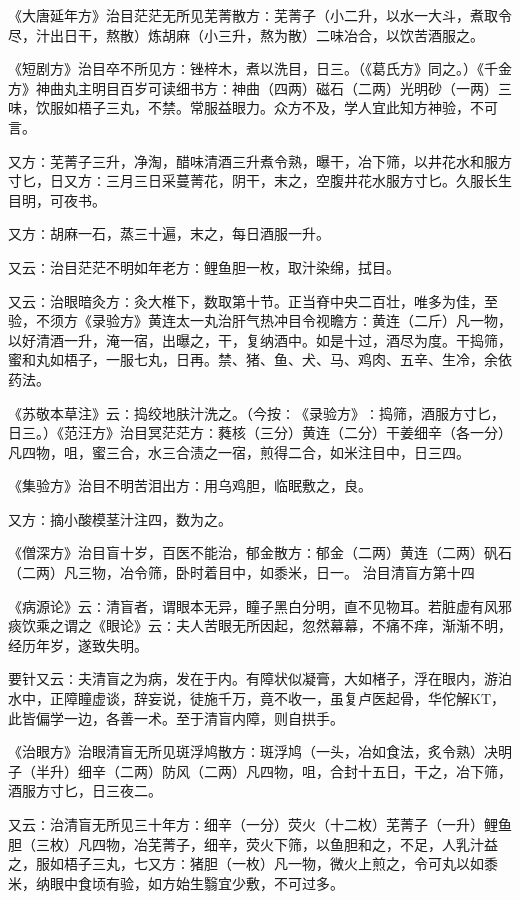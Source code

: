 \documentclass[a4paper,12pt,UTF8,twoside]{ctexbook}
\begin{document}
《大唐延年方》治目茫茫无所见芜菁散方∶芜菁子（小二升，以水一大斗，煮取令尽，汁出日干，熬散）炼胡麻（小三升，熬为散）二味冶合，以饮苦酒服之。

《短剧方》治目卒不所见方∶锉梓木，煮以洗目，日三。（《葛氏方》同之。）《千金方》神曲丸主明目百岁可读细书方∶神曲（四两）磁石（二两）光明砂（一两）三味，饮服如梧子三丸，不禁。常服益眼力。众方不及，学人宜此知方神验，不可言。

又方∶芜菁子三升，净淘，醋味清酒三升煮令熟，曝干，冶下筛，以井花水和服方寸匕，日又方∶三月三日采蔓菁花，阴干，末之，空腹井花水服方寸匕。久服长生目明，可夜书。

又方∶胡麻一石，蒸三十遍，末之，每日酒服一升。

又云∶治目茫茫不明如年老方∶鲤鱼胆一枚，取汁染绵，拭目。

又云∶治眼暗灸方∶灸大椎下，数取第十节。正当脊中央二百壮，唯多为佳，至验，不须方《录验方》黄连太一丸治肝气热冲目令视瞻方∶黄连（二斤）凡一物，以好清酒一升，淹一宿，出曝之，干，复纳酒中。如是十过，酒尽为度。干捣筛，蜜和丸如梧子，一服七丸，日再。禁、猪、鱼、犬、马、鸡肉、五辛、生冷，余依药法。

《苏敬本草注》云∶捣绞地肤汁洗之。（今按∶《录验方》∶捣筛，酒服方寸匕，日三。）《范汪方》治目冥茫茫方∶蕤核（三分）黄连（二分）干姜细辛（各一分）凡四物，咀，蜜三合，水三合渍之一宿，煎得二合，如米注目中，日三四。

《集验方》治目不明苦泪出方∶用乌鸡胆，临眠敷之，良。

又方∶摘小酸模茎汁注四，数为之。

《僧深方》治目盲十岁，百医不能治，郁金散方∶郁金（二两）黄连（二两）矾石（二两）凡三物，冶令筛，卧时着目中，如黍米，日一。
治目清盲方第十四

《病源论》云∶清盲者，谓眼本无异，瞳子黑白分明，直不见物耳。若脏虚有风邪痰饮乘之谓之《眼论》云∶夫人苦眼无所因起，忽然幕幕，不痛不痒，渐渐不明，经历年岁，遂致失明。

要针又云∶夫清盲之为病，发在于内。有障状似凝膏，大如楮子，浮在眼内，游泊水中，正障瞳虚谈，辞妄说，徒施千万，竟不收一，虽复卢医起骨，华佗解KT，此皆偏学一边，各善一术。至于清盲内障，则自拱手。

《治眼方》治眼清盲无所见斑浮鸠散方∶斑浮鸠（一头，冶如食法，炙令熟）决明子（半升）细辛（二两）防风（二两）凡四物，咀，合封十五日，干之，冶下筛，酒服方寸匕，日三夜二。

又云∶治清盲无所见三十年方∶细辛（一分）荧火（十二枚）芜菁子（一升）鲤鱼胆（三枚）凡四物，冶芜菁子，细辛，荧火下筛，以鱼胆和之，不足，人乳汁益之，服如梧子三丸，七又方∶猪胆（一枚）凡一物，微火上煎之，令可丸以如黍米，纳眼中食顷有验，如方始生翳宜少敷，不可过多。
\end{document}
